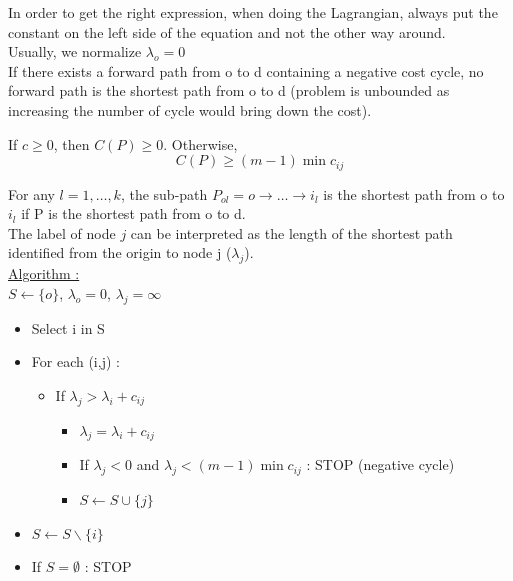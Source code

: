 \documentclass[../main.tex]{subfiles}
\begin{document}
\warning In order to get the right expression, when doing the Lagrangian, always put the constant on the left side of the equation and not the other way around.\\

Usually, we normalize $\lambda_o = 0$\\

If there exists a forward path from o to d containing a negative cost cycle, no forward path is the shortest path from o to d (problem is unbounded as increasing the number of cycle would bring down the cost).\\

\begin{theoremen}
    If $c\geq 0$, then $C(P) \geq 0$. Otherwise, \begin{equation}
        C(P) \geq (m-1) \min c_{ij}
    \end{equation}
\end{theoremen}

For any $l=1,\dots, k$, the sub-path $P_{ol} = o \rightarrow \dots \rightarrow i_l$ is the shortest path from o to $i_l$ if P is the shortest path from o to d.\\

The label of node $j$ can be interpreted as the length of the shortest path identified from the origin to node j ($\lambda_j$).\\

\underline{Algorithm :} \\
$S\leftarrow \{o\}$, $\lambda_o = 0$, $\lambda_j = \infty$\\
\begin{itemize}
    \item Select i in S\\
    \item For each (i,j) : \begin{itemize}
        \item If $\lambda_j > \lambda_i + c_{ij}$ \begin{itemize}
            \item $\lambda_j = \lambda_i+  c_{ij}$\\
            \item If $\lambda_j < 0$ and $\lambda_j < (m-1)\min c_{ij}$ : STOP (negative cycle)\\
            \item $S \leftarrow S\cup \{j\}$\\
        \end{itemize}
    \end{itemize}
    \item $S\leftarrow S\backslash \{i\}$\\
    \item If $S = \emptyset$ : STOP\\
\end{itemize}
\end{document}
